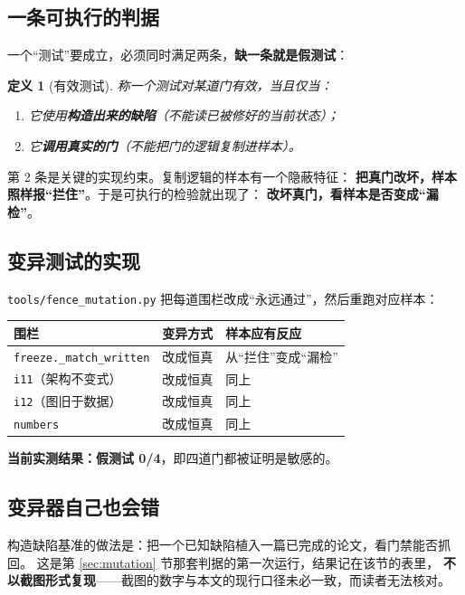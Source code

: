 \documentclass[11pt,a4paper]{article}
\newtheorem{definition}{定义}
\newcommand{\code}[1]{\texttt{#1}}
\begin{document}
\subsection{一条可执行的判据}
一个“测试”要成立，必须同时满足两条，\textbf{缺一条就是假测试}：

\begin{definition}[有效测试]\label{def:test}
称一个测试对某道门有效，当且仅当：
\begin{enumerate}[leftmargin=1.4em,itemsep=1pt]
\item 它使用\textbf{构造出来的缺陷}（不能读已被修好的当前状态）；
\item 它\textbf{调用真实的门}（不能把门的逻辑复制进样本）。
\end{enumerate}
\end{definition}

第 2 条是关键的实现约束。复制逻辑的样本有一个隐蔽特征：
\textbf{把真门改坏，样本照样报“拦住”}。于是可执行的检验就出现了：
\textbf{改坏真门，看样本是否变成“漏检”}。

\subsection{变异测试的实现}
\code{tools/fence\_mutation.py} 把每道围栏改成“永远通过”，然后重跑对应样本：

\begin{center}\small
\begin{tabular}{lll}
\toprule
围栏 & 变异方式 & 样本应有反应\\
\midrule
\code{freeze.\_match\_written} & 改成恒真 & 从“拦住”变成“漏检”\\
\code{i11}（架构不变式） & 改成恒真 & 同上\\
\code{i12}（图旧于数据） & 改成恒真 & 同上\\
\code{numbers} & 改成恒真 & 同上\\
\bottomrule
\end{tabular}
\end{center}

\textbf{当前实测结果：假测试 0/4}，即四道门都被证明是敏感的。

\subsection{变异器自己也会错}

构造缺陷基准的做法是：把一个已知缺陷植入一篇已完成的论文，看门禁能否抓回。
这是第 \ref{sec:mutation} 节那套判据的第一次运行，结果记在该节的表里，
\textbf{不以截图形式复现}——截图的数字与本文的现行口径未必一致，而读者无法核对。
\end{document}
